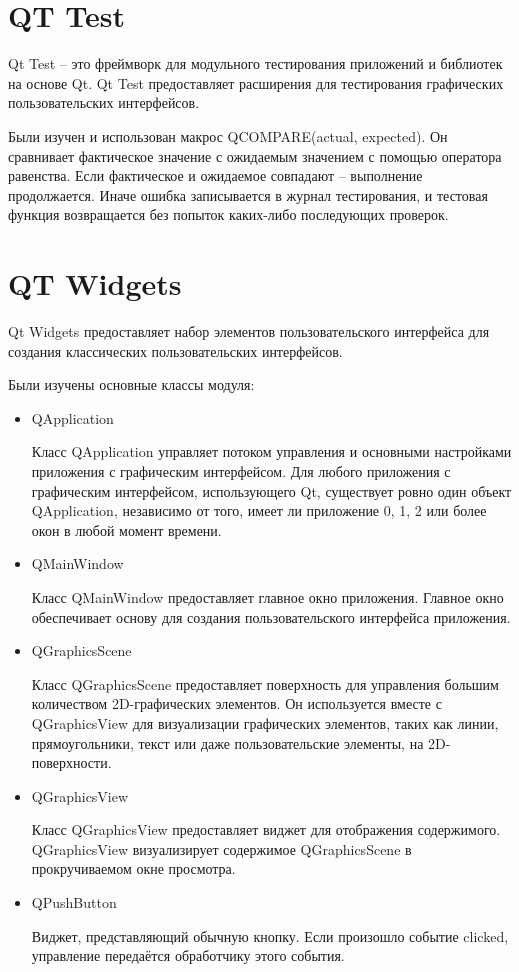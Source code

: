 \section{QT Test}

Qt Test \cite{bib5} -- это фреймворк для модульного тестирования приложений и библиотек на основе Qt. Qt Test предоставляет расширения для тестирования графических пользовательских интерфейсов.

Были изучен и использован макрос QCOMPARE(actual, expected). Он сравнивает фактическое значение с ожидаемым значением с помощью оператора равенства. Если фактическое и ожидаемое совпадают -- выполнение продолжается. Иначе ошибка записывается в журнал тестирования, и тестовая функция возвращается без попыток каких-либо последующих проверок.

\section{QT Widgets}
Qt Widgets \cite{bib6} предоставляет набор элементов пользовательского интерфейса для создания классических пользовательских интерфейсов. 

Были изучены основные классы модуля:
\begin{itemize}
	
	\item QApplication 
	
	Класс QApplication управляет потоком управления и основными настройками приложения с графическим интерфейсом. Для любого приложения с графическим интерфейсом, использующего Qt, существует ровно один объект QApplication, независимо от того, имеет ли приложение 0, 1, 2 или более окон в любой момент времени. 
	
	\item QMainWindow
	
	Класс QMainWindow предоставляет главное окно приложения. Главное окно обеспечивает основу для создания пользовательского интерфейса приложения.
	
	\item QGraphicsScene
	
	Класс QGraphicsScene предоставляет поверхность для управления большим количеством 2D-графических элементов. Он используется вместе с QGraphicsView для визуализации графических элементов, таких как линии, прямоугольники, текст или даже пользовательские элементы, на 2D-поверхности.
	
	\item QGraphicsView
	
	Класс QGraphicsView предоставляет виджет для отображения содержимого. QGraphicsView визуализирует содержимое QGraphicsScene в прокручиваемом окне просмотра. 
		
	\item QPushButton
	
	Виджет, представляющий обычную кнопку. Если произошло событие clicked, управление передаётся обработчику этого события.
	
\end{itemize}


